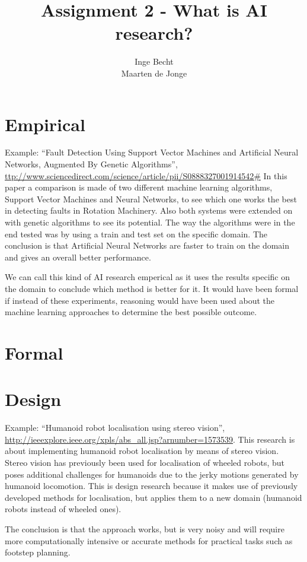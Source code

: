\documentclass[a4paper, 12pt]{article}
\author{Inge Becht \\ Maarten de Jonge}
\title{Assignment 2 - What is AI research?}
\begin{document}
\maketitle

\section{Empirical}
Example: ``Fault Detection Using Support Vector Machines and Artificial Neural
Networks, Augmented By Genetic Algorithms'',
\url{ttp://www.sciencedirect.com/science/article/pii/S0888327001914542#}
In this paper a comparison is made of two different machine learning algorithms,
Support Vector Machines and Neural Networks, to see which one works the best in
detecting faults in Rotation Machinery. Also both systems were extended on with genetic algorithms to
see its potential. The way the algorithms were in the end tested was by using a
train and test set on the specific domain. The conclusion is that Artificial
Neural Networks are faster to train on the domain and gives an overall better
performance. 

We can call this kind of AI research emperical as it uses the results specific
on the domain to conclude which method is better for it. It would have been
formal if instead of these experiments, reasoning would have been used about the
machine learning approaches to determine the best possible outcome.


\section{Formal}

\section{Design}
Example: ``Humanoid robot localisation using stereo vision'',
\url{http://ieeexplore.ieee.org/xpls/abs\_all.jsp?arnumber=1573539}.
This research is about implementing humanoid robot localisation by means of
stereo vision. Stereo vision has previously been used for localisation of
wheeled robots, but poses additional challenges for humanoids due to the jerky
motions generated by humanoid locomotion.
This is design research because it makes use of previously developed methods for
localisation, but applies them to a new domain (humanoid robots instead of
wheeled ones).

The conclusion is that the approach works, but is very noisy and will require
more computationally intensive or accurate methods for practical tasks such as
footstep planning.
	
\end{document}
